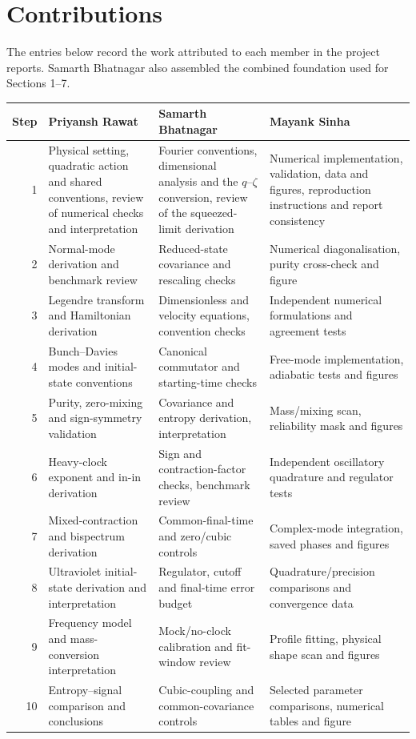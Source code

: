 \documentclass[11pt,a4paper]{article}
\begin{document}
\section*{Contributions}
The entries below record the work attributed to each member in the project reports. Samarth Bhatnagar also assembled the combined foundation used for Sections 1--7.
\par\smallskip
\begingroup\small\renewcommand{\arraystretch}{1.19}
\begin{tabularx}{\linewidth}{@{}r*{3}{>{\raggedright\arraybackslash}X}@{}}\toprule
Step & \textbf{Priyansh Rawat} & \textbf{Samarth Bhatnagar} & \textbf{Mayank Sinha}\\\midrule
1 & Physical setting, quadratic action and shared conventions, review of numerical checks and interpretation & Fourier conventions, dimensional analysis and the $q$--$\zeta$ conversion, review of the squeezed-limit derivation & Numerical implementation, validation, data and figures, reproduction instructions and report consistency \\[3pt]
2 & Normal-mode derivation and benchmark review & Reduced-state covariance and rescaling checks & Numerical diagonalisation, purity cross-check and figure \\[3pt]
3 & Legendre transform and Hamiltonian derivation & Dimensionless and velocity equations, convention checks & Independent numerical formulations and agreement tests \\[3pt]
4 & Bunch--Davies modes and initial-state conventions & Canonical commutator and starting-time checks & Free-mode implementation, adiabatic tests and figures \\[3pt]
5 & Purity, zero-mixing and sign-symmetry validation & Covariance and entropy derivation, interpretation & Mass/mixing scan, reliability mask and figures \\[3pt]
6 & Heavy-clock exponent and in-in derivation & Sign and contraction-factor checks, benchmark review & Independent oscillatory quadrature and regulator tests \\[3pt]
7 & Mixed-contraction and bispectrum derivation & Common-final-time and zero/cubic controls & Complex-mode integration, saved phases and figures \\[3pt]
8 & Ultraviolet initial-state derivation and interpretation & Regulator, cutoff and final-time error budget & Quadrature/precision comparisons and convergence data \\[3pt]
9 & Frequency model and mass-conversion interpretation & Mock/no-clock calibration and fit-window review & Profile fitting, physical shape scan and figures \\[3pt]
10 & Entropy--signal comparison and conclusions & Cubic-coupling and common-covariance controls & Selected parameter comparisons, numerical tables and figure \\[3pt]
\bottomrule\end{tabularx}\endgroup
\end{document}
